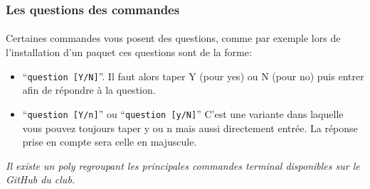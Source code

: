 \subsubsection{Les questions des commandes}

\paragraph{} Certaines commandes vous posent des questions, comme par exemple
lors de l'installation d'un paquet ces questions sont de la forme:

\begin{itemize}
	\item ``\texttt{question [Y/N]}''. Il faut alors taper Y (pour yes) ou N
		(pour no) puis entrer afin de répondre à la question.
	\item ``\texttt{question [Y/n]}'' ou ``\texttt{question [y/N]}'' C'est une
		variante dans laquelle vous pouvez toujours taper y ou n
		mais aussi directement entrée. La réponse prise en compte sera celle en
		majuscule.
\end{itemize}

\textit{Il existe un poly regroupant les principales commandes terminal
disponibles sur le GitHub du club.}

